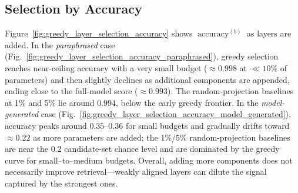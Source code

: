 \subsection{Selection by Accuracy}
Figure~\ref{fig:greedy_layer_selection_accuracy} shows $\operatorname{accuracy}^{(b)}$ as layers are added.
In the \emph{paraphrased} case (Fig.~\ref{fig:greedy_layer_selection_accuracy_paraphrased}), greedy selection reaches near-ceiling accuracy with a very small budget ($\approx0.998$ at $\ll10\%$ of parameters) and then slightly declines as additional components are appended, ending close to the full-model score ($\approx0.993$). The random-projection baselines at 1\% and 5\% lie around $0.994$, below the early greedy frontier. In the \emph{model-generated} case (Fig.~\ref{fig:greedy_layer_selection_accuracy_model_generated}), accuracy peaks around $0.35$–$0.36$ for small budgets and gradually drifts toward $\approx0.22$ as more parameters are added; the 1\%/5\% random-projection baselines are near the $0.2$ candidate-set chance level and are dominated by the greedy curve for small–to–medium budgets. Overall, adding more components does not necessarily improve retrieval—weakly aligned layers can dilute the signal captured by the strongest ones.
